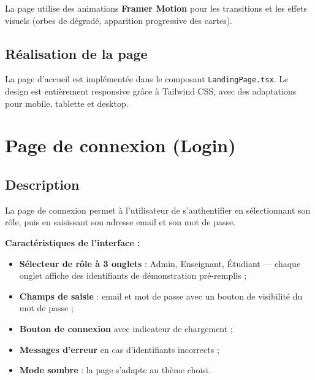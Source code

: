 La page utilise des animations \textbf{Framer Motion} pour les transitions et les effets visuels (orbes de dégradé, apparition progressive des cartes).

\subsection{Réalisation de la page}


La page d'accueil est implémentée dans le composant \texttt{LandingPage.tsx}. Le design est entièrement responsive grâce à Tailwind CSS, avec des adaptations pour mobile, tablette et desktop.

\section{Page de connexion (Login)}

\subsection{Description}

La page de connexion permet à l'utilisateur de s'authentifier en sélectionnant son rôle, puis en saisissant son adresse email et son mot de passe.

\vspace{0.3cm}

\textbf{Caractéristiques de l'interface :}
\begin{itemize}[noitemsep]
    \item \textbf{Sélecteur de rôle à 3 onglets} : Admin, Enseignant, Étudiant — chaque onglet affiche des identifiants de démonstration pré-remplis ;
    \item \textbf{Champs de saisie} : email et mot de passe avec un bouton de visibilité du mot de passe ;
    \item \textbf{Bouton de connexion} avec indicateur de chargement ;
    \item \textbf{Messages d'erreur} en cas d'identifiants incorrects ;
    \item \textbf{Mode sombre} : la page s'adapte au thème choisi.
\end{itemize}

